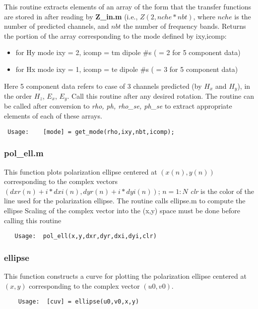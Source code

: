 This routine extracts elements of an array of the form
that the transfer functions are stored in 
after reading by {\bf Z\_in.m} (i.e., $Z(2,nche*nbt)$, where
$nche$ is the number of predicted channels, and $nbt$ the number
of frequency bands. Returns the portion of the array 
corresponding to the mode defined by ixy,icomp:
\begin{itemize}
\item
for Hy mode ixy = 2, icomp = tm dipole \#s ( = 2 for 5 component data)
\item
for Hx mode ixy = 1, icomp = te dipole \#s ( = 3 for 5 component data)
\end{itemize}
Here 5 component data refers to case of 3 channels predicted
(by $H_x$ and $H_y$),
in the order $H_z$, $E_x$, $E_y$.
Call this routine after any desired rotation.
The routine can be called after conversion to {\it rho, ph, rho\_se, ph\_se}
to extract appropriate elements of each of these arrays.

\small
\begin{verbatim}
 Usage:    [mode] = get_mode(rho,ixy,nbt,icomp);
\end{verbatim}
\normalsize

\subsubsection{pol\_ell.m}

This function plots polarization ellipse centered
at $(x(n),y(n))$ corresponding to the complex vectors
$( dxr(n) + i* dxi(n) , dyr(n) + i*dyi(n))$; 
$n = 1:N $    {\it clr} is the color of the line used for 
the polarization ellipse.  
The routine calls ellipse.m to compute the ellipse
Scaling of the complex vector into the (x,y) space
must be done before calling this routine

\small
\begin{verbatim}
   Usage:  pol_ell(x,y,dxr,dyr,dxi,dyi,clr)
\end{verbatim}
\normalsize

\subsubsection{ellipse}

This function constructs a curve for plotting
the polarization ellipse centered at $(x,y)$
corresponding to the complex vector $(u0,v0)$.

\small
\begin{verbatim}
    Usage:  [cuv] = ellipse(u0,v0,x,y)
\end{verbatim}
\normalsize


